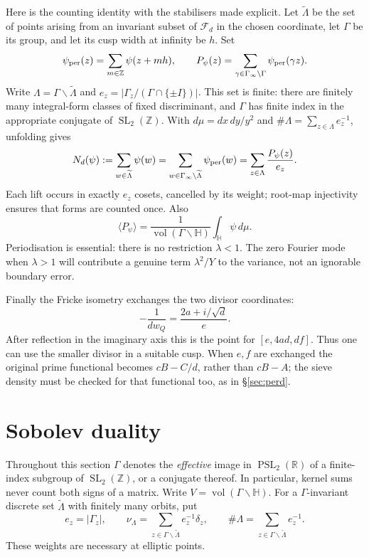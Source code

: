 \documentclass[10pt,reqno]{amsart}
\theoremstyle{definition}
\numberwithin{equation}{section}
\newcommand{\Z}{\mathbb Z}
\newcommand{\R}{\mathbb R}
\newcommand{\HH}{\mathbb H}
\newcommand{\cF}{\mathcal F}
\DeclareMathOperator{\SL}{SL}
\DeclareMathOperator{\PSL}{PSL}
\DeclareMathOperator{\vol}{vol}
\begin{document}
Here is the counting identity with the stabilisers made explicit.
Let $\widetilde\Lambda$ be the set of points arising from an invariant
subset of $\cF_d$ in the chosen coordinate, let $\Gamma$ be its group,
and let its cusp width at infinity be $h$. Set
\[
 \psi_{\rm per}(z)=\sum_{m\in\Z}\psi(z+mh),\qquad
 P_\psi(z)=\sum_{\gamma\in\Gamma_\infty\backslash\Gamma}
                                     \psi_{\rm per}(\gamma z).
\]
Write $\Lambda=\Gamma\backslash\widetilde\Lambda$ and
$e_z=|\Gamma_z/(\Gamma\cap\{\pm I\})|$. This set is finite: there are
finitely many integral-form classes of fixed discriminant, and $\Gamma$
has finite index in the appropriate conjugate of $\SL_2(\Z)$.
With $d\mu=dx\,dy/y^2$ and $\#\Lambda=\sum_{z\in\Lambda}e_z^{-1}$,
unfolding gives
\begin{equation}\label{A:eq:countidentity}
 N_d(\psi):=\sum_{w\in\widetilde\Lambda}\psi(w)
 =\sum_{w\in\Gamma_\infty\backslash\widetilde\Lambda}\psi_{\rm per}(w)
 =\sum_{z\in\Lambda}\frac{P_\psi(z)}{e_z}.
\end{equation}
Each lift occurs in exactly $e_z$ cosets, cancelled by its weight;
root-map injectivity ensures that forms are counted once. Also
\[
 \langle P_\psi\rangle=
       \frac1{\vol(\Gamma\backslash\HH)}\int_{\HH}\psi\,d\mu.
\]
Periodisation is essential: there is no restriction $\lambda<1$.
The zero Fourier mode when $\lambda>1$ will contribute a genuine term
$\lambda^2/Y$ to the variance, not an ignorable boundary error.

Finally the Fricke isometry exchanges the two divisor coordinates:
\[
 -\frac1{dw_Q}=\frac{2a+i/\sqrt d}{e}.
\]
After reflection in the imaginary axis this is the point for
$[e,4ad,df]$. Thus one can use the smaller divisor in a suitable cusp.
When $e,f$ are exchanged the original prime functional becomes
$cB-C/d$, rather than $cB-A$; the sieve density must be checked for that
functional too, as in \S\ref{sec:perd}.

\section{Sobolev duality}\label{sec:sobolev}
Throughout this section \(\Gamma\) denotes the
\emph{effective} image in \(\PSL_2(\R)\) of a finite-index subgroup of
\(\SL_2(\Z)\), or a conjugate thereof. In particular, kernel sums never
count both signs of a matrix. Write \(V=\vol(\Gamma\backslash\HH)\).
For a \(\Gamma\)-invariant discrete set \(\widetilde\Lambda\) with finitely
many orbits, put
\[
 e_z=|\Gamma_z|,\qquad
 \nu_\Lambda=\sum_{z\in\Gamma\backslash\widetilde\Lambda}e_z^{-1}\delta_z,
 \qquad \#\Lambda=\sum_{z\in\Gamma\backslash\widetilde\Lambda}e_z^{-1}.
\]
These weights are necessary at elliptic points.
\end{document}
